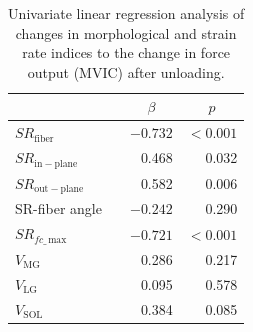 \begin{table}[!htb]
\vspace{+0.2cm}
\caption[Univariate linear regression analysis of changes in morphological and strain rate indices to the change in force output after unloading]{Univariate linear regression analysis of changes in morphological and strain rate indices to the change in force output (MVIC) after unloading.}
\label{tab: SR1_4}
\begin{center}
\begin{tabular}{@{}lrrr@{}}
\toprule[1pt]\midrule[0.3pt] 
               &  & \multicolumn{1}{c}{$\beta$}      & \multicolumn{1}{c}{$p$}            \\ \midrule
$SR_{\mathrm{fiber}}$ 	 &  & $-0.732$    & $<0.001$    \\ [2pt]
$SR_{\mathrm{in-plane}}$  &  & 0.468     & 0.032              \\ [2pt]
$SR_{\mathrm{out-plane}}$ &  & 0.582     & 0.006              \\ [2pt]
SR-fiber angle 			 &  & $-0.242$    & 0.290              \\ [2pt]
$SR_{fc\_\,\mathrm{max}}$&  & $-0.721$     & $<0.001$   \\ [2pt]
$V_{\mathrm{MG}}$        &  & 0.286     & 0.217              \\ [2pt]
$V_{\mathrm{LG}}$ 		 &  & 0.095     & 0.578              \\ [2pt]
$V_{\mathrm{SOL}}$		 &  & 0.384     & 0.085              \\ \midrule[0.3pt]\bottomrule[1pt]

\end{tabular}
\end{center}
\vspace{-0.2cm}
\end{table}
